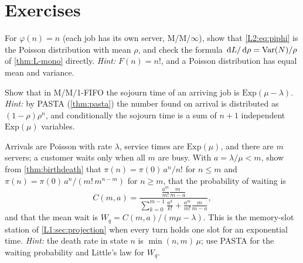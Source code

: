 \section{Exercises}

\begin{exercise}\label{L2:ex:mminf}
For $\varphi(n)=n$ (each job has its own server, M/M/$\infty$), show that
\eqref{L2:eq:piphi} is the Poisson distribution with mean $\rho$, and check the formula
$\,\mathrm{d} L/\,\mathrm{d}\rho=\operatorname{Var}(N)/\rho$ of \cref{thm:L-mono} directly.
\emph{Hint:} $F(n)=n!$, and a Poisson distribution has equal mean and variance.
\end{exercise}

\begin{exercise}\label{L2:ex:mm1wait}
Show that in M/M/1-FIFO the sojourn time of an arriving job is $\mathrm{Exp}(\mu-\lambda)$.
\emph{Hint:} by PASTA (\cref{thm:pasta}) the number found on arrival is distributed as
$(1-\rho)\rho^n$, and conditionally the sojourn time is a sum of $n+1$ independent
$\mathrm{Exp}(\mu)$ variables.
\end{exercise}

\begin{exercise}\label{L2:ex:mmm}
Arrivals are Poisson with rate $\lambda$, service times are $\mathrm{Exp}(\mu)$, and there
are $m$ servers; a customer waits only when all $m$ are busy. With $a=\lambda/\mu<m$,
show from \cref{thm:birthdeath} that
$\pi(n)=\pi(0)\,a^n/n!$ for $n\le m$ and $\pi(n)=\pi(0)\,a^n/(m!\,m^{n-m})$ for $n\ge m$,
that the probability of waiting is
\[
  C(m,a)=\frac{\frac{a^m}{m!}\frac{m}{m-a}}{\sum_{k=0}^{m-1}\frac{a^k}{k!}+\frac{a^m}{m!}\frac{m}{m-a}},
\]
and that the mean wait is $W_q=C(m,a)/(m\mu-\lambda)$. This is the memory-slot station
of \cref{L1:sec:projection} when every turn holds one slot for an exponential time.
\emph{Hint:} the death rate in state $n$ is $\min(n,m)\,\mu$; use PASTA for the waiting
probability and Little's law for $W_q$.
\end{exercise}
